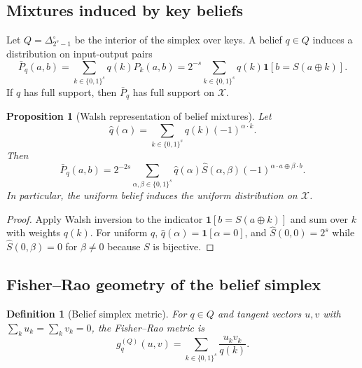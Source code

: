 \documentclass[referee,lineno,pdflatex,sn-mathphys-num]{sn-jnl}
\theoremstyle{thmstylethree}
\newtheorem{definition}{Definition}[section]
\theoremstyle{thmstyletwo}
\theoremstyle{thmstyleone}
\newtheorem{proposition}{Proposition}[section]
\newcommand{\B}[1]{\{0,1\}^{#1}}
\begin{document}
\subsection{Mixtures induced by key beliefs}\label{subsec:belief-mixture}

Let $Q=\Delta_{2^s-1}^{\circ}$ be the interior of the simplex over keys.  A
belief $q\in Q$ induces a distribution on input-output pairs
\begin{equation}\label{eq:mixture-belief}
  \bar P_q(a,b)=\sum_{k\in\B{s}}q(k)P_k(a,b)
  =2^{-s}\sum_{k\in\B{s}}q(k)\mathbf 1[b=S(a\oplus k)].
\end{equation}
If $q$ has full support, then $\bar P_q$ has full support on $\mathcal X$.

\begin{proposition}[Walsh representation of belief mixtures]\label{prop:belief-walsh}
Let
\[
  \widehat q(\alpha)=\sum_{k\in\B{s}}q(k)(-1)^{\alpha\cdot k}.
\]
Then
\begin{equation}\label{eq:belief-walsh}
  \bar P_q(a,b)
  =2^{-2s}\sum_{\alpha,\beta\in\B{s}}
  \widehat q(\alpha)\widehat S(\alpha,\beta)
  (-1)^{\alpha\cdot a\oplus\beta\cdot b}.
\end{equation}
In particular, the uniform belief induces the uniform distribution on
$\mathcal X$.
\end{proposition}

\begin{proof}
Apply Walsh inversion to the indicator
$\mathbf 1[b=S(a\oplus k)]$ and sum over $k$ with weights $q(k)$.  For uniform
$q$, $\widehat q(\alpha)=\mathbf 1[\alpha=0]$, and
$\widehat S(0,0)=2^s$ while $\widehat S(0,\beta)=0$ for $\beta\neq0$ because
$S$ is bijective.
\end{proof}

\subsection{Fisher--Rao geometry of the belief simplex}\label{subsec:belief-geometry}

\begin{definition}[Belief simplex metric]\label{def:belief-simplex}
For $q\in Q$ and tangent vectors $u,v$ with $\sum_k u_k=\sum_k v_k=0$, the
Fisher--Rao metric is
\begin{equation}\label{eq:belief-fisher}
  g_q^{(Q)}(u,v)=\sum_{k\in\B{s}}\frac{u_kv_k}{q(k)}.
\end{equation}
\end{definition}
\end{document}
